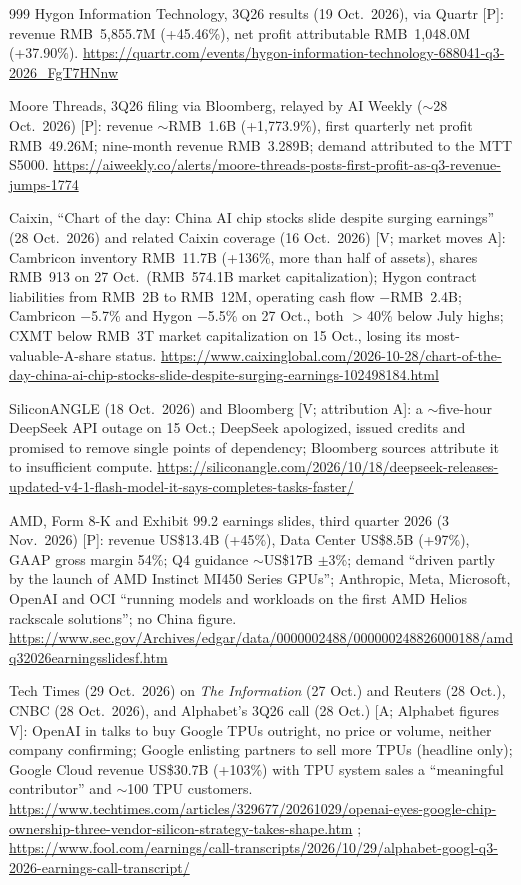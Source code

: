 \begin{thebibliography}{999}
 Hygon Information Technology, 3Q26 results (19 Oct.\ 2026), via Quartr [P]: revenue RMB~5,855.7M (+45.46\%), net profit attributable RMB~1,048.0M (+37.90\%). \url{https://quartr.com/events/hygon-information-technology-688041-q3-2026_FgT7HNnw}

 Moore Threads, 3Q26 filing via Bloomberg, relayed by AI Weekly ($\sim$28 Oct.\ 2026) [P]: revenue $\sim$RMB~1.6B (+1,773.9\%), first quarterly net profit RMB~49.26M; nine-month revenue RMB~3.289B; demand attributed to the MTT S5000. \url{https://aiweekly.co/alerts/moore-threads-posts-first-profit-as-q3-revenue-jumps-1774}

 Caixin, ``Chart of the day: China AI chip stocks slide despite surging earnings'' (28 Oct.\ 2026) and related Caixin coverage (16 Oct.\ 2026) [V; market moves A]: Cambricon inventory RMB~11.7B (+136\%, more than half of assets), shares RMB~913 on 27 Oct.\ (RMB~574.1B market capitalization); Hygon contract liabilities from RMB~2B to RMB~12M, operating cash flow $-$RMB~2.4B; Cambricon $-$5.7\% and Hygon $-$5.5\% on 27 Oct., both $>$40\% below July highs; CXMT below RMB~3T market capitalization on 15 Oct., losing its most-valuable-A-share status. \url{https://www.caixinglobal.com/2026-10-28/chart-of-the-day-china-ai-chip-stocks-slide-despite-surging-earnings-102498184.html}

 SiliconANGLE (18 Oct.\ 2026) and Bloomberg [V; attribution A]: a $\sim$five-hour DeepSeek API outage on 15 Oct.; DeepSeek apologized, issued credits and promised to remove single points of dependency; Bloomberg sources attribute it to insufficient compute. \url{https://siliconangle.com/2026/10/18/deepseek-releases-updated-v4-1-flash-model-it-says-completes-tasks-faster/}

 AMD, Form 8-K and Exhibit 99.2 earnings slides, third quarter 2026 (3 Nov.\ 2026) [P]: revenue US\$13.4B (+45\%), Data Center US\$8.5B (+97\%), GAAP gross margin 54\%; Q4 guidance $\sim$US\$17B $\pm$3\%; demand ``driven partly by the launch of AMD Instinct MI450 Series GPUs''; Anthropic, Meta, Microsoft, OpenAI and OCI ``running models and workloads on the first AMD Helios rackscale solutions''; no China figure. \url{https://www.sec.gov/Archives/edgar/data/0000002488/000000248826000188/amdq32026earningsslidesf.htm}

 Tech Times (29 Oct.\ 2026) on \emph{The Information} (27 Oct.) and Reuters (28 Oct.), CNBC (28 Oct.\ 2026), and Alphabet's 3Q26 call (28 Oct.) [A; Alphabet figures V]: OpenAI in talks to buy Google TPUs outright, no price or volume, neither company confirming; Google enlisting partners to sell more TPUs (headline only); Google Cloud revenue US\$30.7B (+103\%) with TPU system sales a ``meaningful contributor'' and $\sim$100 TPU customers. \url{https://www.techtimes.com/articles/329677/20261029/openai-eyes-google-chip-ownership-three-vendor-silicon-strategy-takes-shape.htm} ; \url{https://www.fool.com/earnings/call-transcripts/2026/10/29/alphabet-googl-q3-2026-earnings-call-transcript/}


\end{thebibliography}
